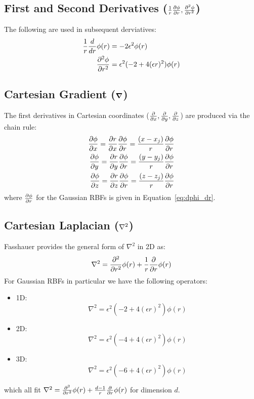 \documentclass[11pt]{report}
\begin{document}
{\subsection{First and Second Derivatives ($\frac{1}{r}\frac{\partial \phi}{\partial r}, \frac{\partial^2 \phi}{\partial r^2}$)}
The following are used in subsequent derviatives:
\begin{align}
\frac{1}{r}\frac{d }{d r}\phi(r) & = -2 \epsilon^2 \phi(r) \label{eq:dphi_dr} \\
\frac{\partial^2 \phi}{\partial r^2} & = \epsilon^2(-2 + 4(\epsilon r)^2)\phi(r)
\end{align}



\subsection{Cartesian Gradient ($\grad$)}
The first derivatives in Cartesian coordinates ($\frac{\partial }{\partial x}, \frac{\partial }{\partial y}, \frac{\partial }{\partial z}$) are produced via the chain rule:
	\begin{align*} 
	 \frac{\partial \phi}{\partial x} = \frac{\partial r}{\partial x} \frac{\partial \phi}{\partial r} = \frac{(x-x_{j})}{r} \frac{\partial \phi}{\partial r} \\
	 \frac{\partial \phi}{\partial y} = \frac{\partial r}{\partial y} \frac{\partial \phi}{\partial r} = \frac{(y-y_{j})}{r} \frac{\partial \phi}{\partial r} \\
	 \frac{\partial \phi}{\partial z} = \frac{\partial r}{\partial z} \frac{\partial \phi}{\partial r} = \frac{(z-z_{j})}{r} \frac{\partial \phi}{\partial r}
	\end{align*}
where $\frac{\partial \phi}{\partial r}$ for the Gaussian RBFs is given in Equation~\ref{eq:dphi_dr}. 


\subsection{Cartesian Laplacian ($\Laplacian$)}
Fasshauer \cite{Fasshauer2007} provides the general form of $\nabla^2$ in 2D as: 
\begin{align*}
\nabla^2 = \frac{\partial^2 }{\partial r^2}\phi(r) + \frac{1}{r}\frac{\partial }{\partial r} \phi(r) 
\end{align*}
For Gaussian RBFs in particular we have the following operators:
\begin{itemize}
\item 1D: $$\nabla^2 = \epsilon^2 (-2 + 4 (\epsilon r)^2) \phi(r)$$
\item 2D: $$\nabla^2 = \epsilon^2 (-4 + 4 (\epsilon r)^2) \phi(r)$$
\item 3D: $$\nabla^2 = \epsilon^2 (-6 + 4 (\epsilon r)^2) \phi(r)$$
\end{itemize}
which all fit $\nabla^2 = \frac{\partial^2 }{\partial r^2}\phi(r) + \frac{d - 1}{r}\frac{\partial }{\partial r} \phi(r)$ for dimension $d$.

}
\end{document}
